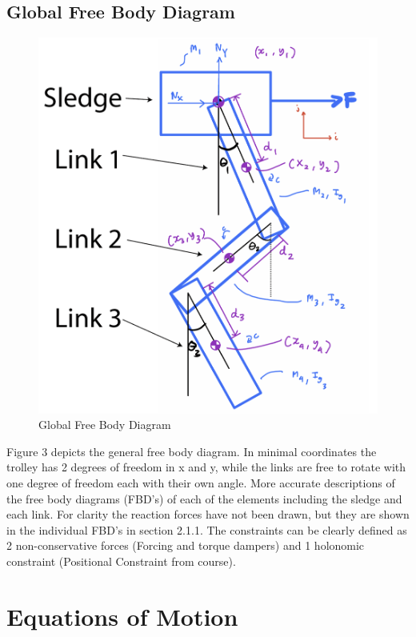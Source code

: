 \documentclass{article}
\begin{document}
\subsection{Global Free Body Diagram}
\begin{figure}[H]
	\centering
	\includegraphics[scale=0.5]{global_FBD_1_anno}	
	\caption{Global Free Body Diagram}
\end{figure}
Figure 3 depicts the general free body diagram. In minimal coordinates the trolley has 2 degrees of freedom in x and y, while the links are free to rotate with one degree of freedom each with their own angle. More accurate descriptions of the free body diagrams (FBD's) of each of the elements including the sledge and each link. For clarity the reaction forces have not been drawn, but they are shown in the individual FBD's in section 2.1.1. The constraints can be clearly defined as 2 non-conservative forces (Forcing and torque dampers) and 1 holonomic constraint (Positional Constraint from course).

\section{Equations of Motion}
\end{document}

